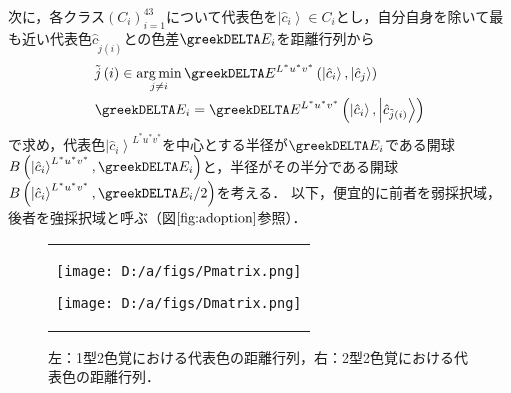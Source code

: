 \documentclass[uplatex,paper=a4,fontsize=4.0truemm,jafontsize=4.0truemm,head_space=30.0truemm,foot_space=30.0truemm,baselineskip=8.0truemm,line_length=40zw,gutter=25.0truemm,oneside,openany,fleqn,hanging_panctuation,open_bracket_pos=nibu_tentsuki,dvipdfmx,jis2004,book,titlepage]{jlreq}
\theoremstyle{mystyle}
\newcommand{\captiondot}[1]{\caption{#1．}}
\newcommand{\mathdisplaystyle}[1]{\(\displaystyle{#1}\)}
\newcommand{\Reference}[1]{\mathdisplaystyle{\ref{#1}}}
\newcommand{\parentheses}[1]{\left(#1\right)}
\newcommand{\Diracket}[1]{\left\lvert#1\right\rangle}
\begin{document}
				次に，各クラス\mathdisplaystyle{{\parentheses{C_i}}_{i=1}^{43}}について代表色を\mathdisplaystyle{\Diracket{\hat{c}_i}\in C_i}とし，自分自身を除いて最も近い代表色\mathdisplaystyle{{\hat{c}}_{\tilde{j}\parentheses{i}}}との色差\mathdisplaystyle{\greekDELTA E_i}を距離行列から
				\begin{align*}
					&\tilde{j}\parentheses{i}\in\operatorname*{arg\,min}_{j\neq i}{\greekDELTA E^{L^\ast u^\ast v^\ast}\parentheses{\Diracket{\hat{c}_i},\Diracket{\hat{c}_j}}}\\
					&\greekDELTA E_i=\greekDELTA E^{L^\ast u^\ast v^\ast}\parentheses{\Diracket{\hat{c}_i},\Diracket{\hat{c}_{\tilde{j}\parentheses{i}}}}
				\end{align*}
				で求め，代表色\mathdisplaystyle{\Diracket{\hat{c}_i}^{L^\ast u^\ast v^\ast}}を中心とする半径が\mathdisplaystyle{\greekDELTA E_i}である開球\mathdisplaystyle{B\parentheses{\Diracket{\hat{c}_i}^{L^\ast u^\ast v^\ast},\greekDELTA E_i}}と，半径がその半分である開球\mathdisplaystyle{B\parentheses{\Diracket{\hat{c}_i}^{L^\ast u^\ast v^\ast},\greekDELTA E_i/2}}を考える．
				以下，便宜的に前者を弱採択域，後者を強採択域と呼ぶ（図\Reference{fig:adoption}参照）．
				\begin{figure}[tbp]
					\centering
					\begin{tabular}{c}
						\begin{minipage}{0.5\linewidth}
							\centering
							\texttt{[image: D:/a/figs/Pmatrix.png]}
						\end{minipage}
						\begin{minipage}{0.5\linewidth}
							\centering
							\texttt{[image: D:/a/figs/Dmatrix.png]}
						\end{minipage}
					\end{tabular}
					\captiondot{左：1型2色覚における代表色の距離行列，右：2型2色覚における代表色の距離行列}\label{fig:distmatrix}
				\end{figure}
\end{document}
